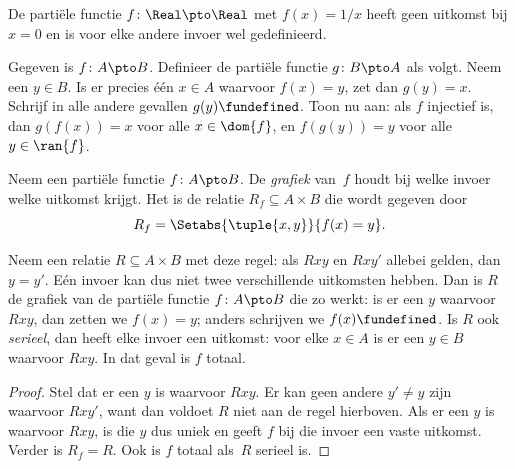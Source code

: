 \documentclass[openany]{memoir}
\begin{document}
\begin{ex}
De partiële functie $f \colon \Real \pto \Real$ met $f(x) = 1/x$ heeft
geen uitkomst bij $x = 0$ en is voor elke andere invoer wel
gedefinieerd.
\end{ex}

\begin{prob}
Gegeven is $f\colon A \pto B$. Definieer de partiële functie $g\colon
B \pto A$ als volgt. Neem een $y \in B$. Is er precies één $x \in A$
waarvoor $f(x) = y$, zet dan $g(y) = x$. Schrijf in alle andere
gevallen $g(y) \fundefined$. Toon nu aan: als $f$ injectief is, dan
$g(f(x)) = x$ voor alle $x \in \dom{f}$, en $f(g(y)) = y$ voor alle
$y \in \ran{f}$.
\end{prob}

\begin{defn}
Neem een partiële functie $f\colon A \pto B$. De \emph{grafiek} van~$f$
houdt bij welke invoer welke uitkomst krijgt. Het is de relatie
$R_f \subseteq A \times B$ die wordt gegeven door
\[
R_f = \Setabs{\tuple{x,y}}{f(x) = y}.
\]
\end{defn}

\begin{prop}
Neem een relatie $R \subseteq A \times B$ met deze regel: als $Rxy$ en
$Rxy'$ allebei gelden, dan $y = y'$. Eén invoer kan dus niet twee
verschillende uitkomsten hebben. Dan is $R$ de grafiek van de partiële
functie $f\colon A \pto B$ die zo werkt: is er een $y$ waarvoor $Rxy$,
dan zetten we $f(x) = y$; anders schrijven we $f(x) \fundefined$. Is
$R$ ook \emph{serieel}, dan heeft elke invoer een uitkomst: voor elke
$x \in A$ is er een $y \in B$ waarvoor $Rxy$. In dat geval is $f$
totaal.
\end{prop}

\begin{proof}
Stel dat er een $y$ is waarvoor $Rxy$. Er kan geen andere $y' \neq y$
zijn waarvoor $Rxy'$, want dan voldoet $R$ niet aan de regel hierboven.
Als er een $y$ is waarvoor $Rxy$, is die $y$ dus uniek en geeft $f$ bij
die invoer een vaste uitkomst. Verder is $R_f = R$. Ook is $f$ totaal
als~$R$ serieel is.
\end{proof}
\endgroup
\OLEndChapterHook

\begingroup
\def\olfilename{OLP-0027}
\def\olfilepath{content/sets-functions-relations/size-of-sets/}
\hypertarget{unit-OLP-0027}{}
\end{document}
